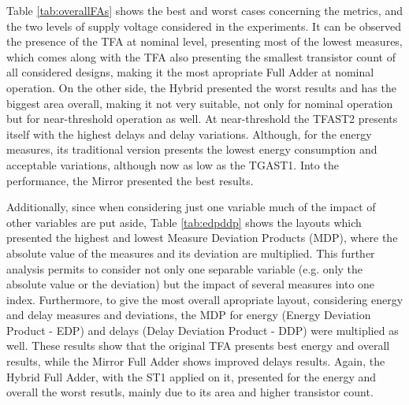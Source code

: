\documentclass[diss,pgmicro,english]{iiufrgs}
\begin{document}
Table \ref{tab:overallFAs} shows the best and worst cases concerning the metrics, and the two levels of supply voltage considered in the experiments. It can be observed the presence of the TFA at nominal level, presenting most of the lowest measures, which comes along with the TFA also presenting the smallest transistor count of all considered designs, making it the most apropriate Full Adder at nominal operation. On the other side, the Hybrid presented the worst results and has the biggest area overall, making it not very suitable, not only for nominal operation but for near-threshold operation as well. At near-threshold the TFAST2 presents itself with the highest delays and delay variations. Although, for the energy measures, its traditional version presents the lowest energy consumption and acceptable variations, although now as low as the TGAST1. Into the performance, the Mirror presented the best results.

\begin{table}[]
\centering
\caption{Best and worst cases considering all metrics and the two types of operation considered in the experiments.}
\label{tab:overallFAs}
\end{table}

Additionally, since when considering just one variable much of the impact of other variables are put aside, Table \ref{tab:edpddp} shows the layouts which presented the highest and lowest Measure Deviation Products (MDP), where the absolute value of the measures and its deviation are multiplied. This further analysis permits to consider not only one separable variable (e.g. only the absolute value or the deviation) but the impact of several measures into one index. Furthermore, to give the most overall apropriate layout, considering energy and delay measures and deviations, the MDP for energy (Energy Deviation Product - EDP) and delays (Delay Deviation Product - DDP) were multiplied as well. These results show that the original TFA presents best energy and overall results, while the Mirror Full Adder shows improved delays results. Again, the Hybrid Full Adder, with the ST1 applied on it, presented for the energy and overall the worst resutls, mainly due to its area and higher transistor count.
\end{document}
